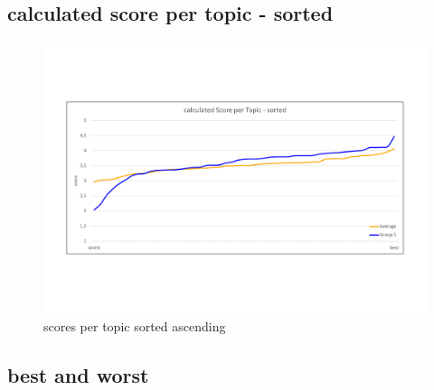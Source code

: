 \subsection{calculated score per topic - sorted}

\begin{figure}[H]
	\centering
	\includegraphics[trim= 0 150 0 150,width=\textwidth]{img/score_per_topic_sorted.pdf}
	\caption{scores per topic sorted ascending}
	\label{fig:spts}
\end{figure}

\subsection{best and worst}